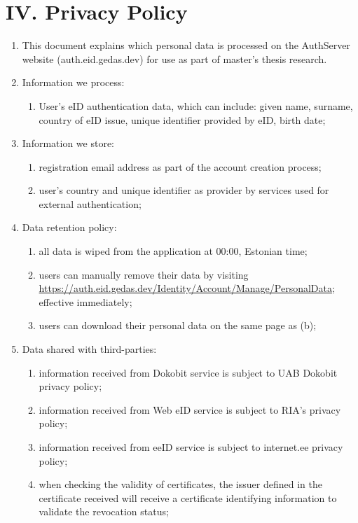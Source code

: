 \section*{IV. Privacy Policy}
\label{appendix:privacy}

\begin{enumerate}
    \item This document explains which personal data is processed on the AuthServer website (auth.eid.gedas.dev) for use as part of master's thesis research.
    \item Information we process:
    \begin{enumerate}
        \item User's eID authentication data, which can include: given name, surname, country of eID issue, unique identifier provided by eID, birth date;
    \end{enumerate}
    \item Information we store:
    \begin{enumerate}
        \item registration email address as part of the account creation process;
        \item user's country and unique identifier as provider by services used for external authentication;
    \end{enumerate}
    \item Data retention policy:
    \begin{enumerate}
        \item all data is wiped from the application at 00:00, Estonian time;
        \item users can manually remove their data by visiting \url{https://auth.eid.gedas.dev/Identity/Account/Manage/PersonalData}; effective immediately;
        \item users can download their personal data on the same page as (b);
    \end{enumerate}
    \item Data shared with third-parties:
    \begin{enumerate}
        \item information received from Dokobit service is subject to UAB Dokobit privacy policy;
        \item information received from Web eID service is subject to RIA's privacy policy;
        \item information received from eeID service is subject to internet.ee privacy policy;
        \item when checking the validity of certificates, the issuer defined in the certificate received will receive a certificate identifying information to validate the revocation status;
    \end{enumerate}
\end{enumerate}

